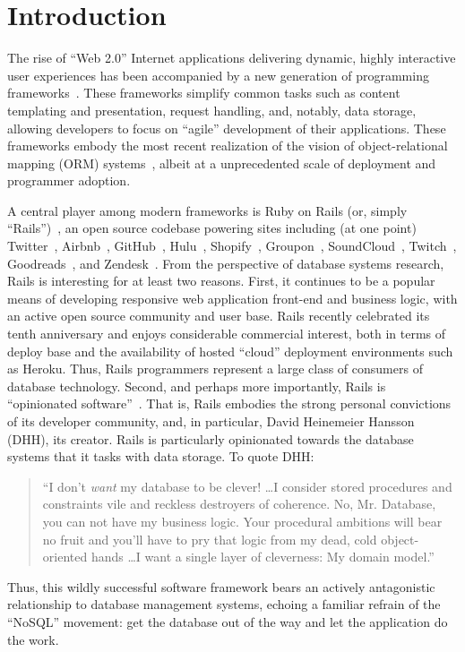 
\section{Introduction}
\label{sec:intro}

The rise of ``Web 2.0'' Internet applications delivering dynamic, highly
interactive user experiences has been accompanied by a new generation
of programming frameworks~\cite{web20}. These frameworks simplify
common tasks such as content templating and presentation, request
handling, and, notably, data storage, allowing developers to focus on
``agile'' development of their applications. These frameworks embody
the most recent realization of the vision of object-relational mapping
(ORM) systems~\cite{orm-db}, albeit at a unprecedented scale of deployment and
programmer adoption.

A central player among modern frameworks is Ruby on Rails (or, simply
``Rails'')~\cite{rails-book,rails-computer}, an open source codebase
powering sites including (at one point) Twitter~\cite{twitter-rails},
Airbnb~\cite{airbnb-rails}, GitHub~\cite{github-rails},
Hulu~\cite{hulu-rails}, Shopify~\cite{shopify-rails},
Groupon~\cite{groupon-rails}, SoundCloud~\cite{soundcloud-rails},
Twitch~\cite{twitch-rails}, Goodreads~\cite{goodreads-rails}, and
Zendesk~\cite{zendesk-rails}. From the perspective of database systems
research, Rails is interesting for at least two reasons. First, it
continues to be a popular means of developing responsive web
application front-end and business logic, with an active open source
community and user base. Rails recently celebrated its tenth
anniversary and enjoys considerable commercial interest, both in terms
of deploy base and the availability of hosted ``cloud'' deployment
environments such as Heroku. Thus, Rails programmers represent a large
class of consumers of database technology. Second, and perhaps more
importantly, Rails is ``opinionated
software''~\cite{dhh-opinionated}. That is, Rails embodies the strong
personal convictions of its developer community, and, in particular,
David Heinemeier Hansson (DHH), its creator. Rails is particularly
opinionated towards the database systems that it tasks with data
storage. To quote DHH:
\begin{quote}
``I don't \textit{want} my database to be clever! \dots I consider stored procedures and constraints vile and reckless destroyers of coherence. No, Mr. Database, you can not have my business logic. Your procedural ambitions will bear no fruit and you'll have to pry that logic from my dead, cold object-oriented hands \dots I want a single layer of cleverness: My domain model.''~\cite{dhh-clever}
\end{quote}
Thus, this wildly successful software framework bears an actively
antagonistic relationship to database management systems, echoing a familiar refrain of the ``NoSQL'' movement: get the database out of the way and let the application do the work.

